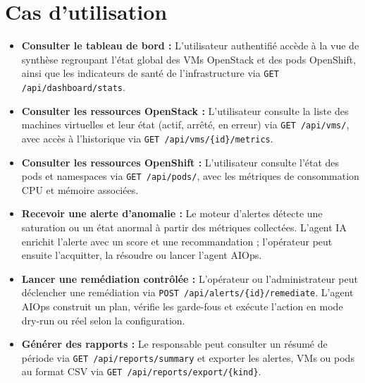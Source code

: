 \documentclass[11pt,a4paper]{report}
\begin{document}
\newpage
\section{Cas d'utilisation}

\begin{itemize}[label=\textbullet, leftmargin=1.5cm, labelsep=0.5cm,
                itemsep=0.4em, parsep=0em, topsep=0.4em]

    \item \textbf{Consulter le tableau de bord :}
    L'utilisateur authentifié accède à la vue de synthèse regroupant l'état
    global des VMs OpenStack et des pods OpenShift, ainsi que les indicateurs
    de santé de l'infrastructure via \texttt{GET /api/dashboard/stats}.

    \item \textbf{Consulter les ressources OpenStack :}
    L'utilisateur consulte la liste des machines virtuelles et leur état
    (actif, arrêté, en erreur) via \texttt{GET /api/vms/}, avec accès à
    l'historique via \texttt{GET /api/vms/\{id\}/metrics}.

    \item \textbf{Consulter les ressources OpenShift :}
    L'utilisateur consulte l'état des pods et namespaces via
    \texttt{GET /api/pods/}, avec les métriques de consommation CPU
    et mémoire associées.

    \item \textbf{Recevoir une alerte d'anomalie :}
    Le moteur d'alertes détecte une saturation ou un état anormal à partir des
    métriques collectées. L'agent IA enrichit l'alerte avec un score et une
    recommandation ; l'opérateur peut ensuite l'acquitter, la résoudre ou
    lancer l'agent AIOps.

    \item \textbf{Lancer une remédiation contrôlée :}
    L'opérateur ou l'administrateur peut déclencher une remédiation via
    \texttt{POST /api/alerts/\{id\}/remediate}. L'agent AIOps construit un
    plan, vérifie les garde-fous et exécute l'action en mode dry-run ou réel
    selon la configuration.

    \item \textbf{Générer des rapports :}
    Le responsable peut consulter un résumé de période via
    \texttt{GET /api/reports/summary} et exporter les alertes, VMs ou pods au
    format CSV via \texttt{GET /api/reports/export/\{kind\}}.

\end{itemize}
\end{document}
